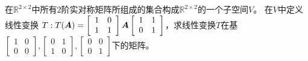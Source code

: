 \begin{frame}
  \begin{li}
    在$\mathbb R^{2\times 2}$中所有$2$阶实对称矩阵所组成的集合构成$\mathbb R^{2\times 2}$的一个子空间$V$。
    在$V$中定义线性变换
    $T:T(\boldsymbol{A})=
    \left[
      \begin{array}{cc}
        1&0\\
        1&1
      \end{array}
    \right]\boldsymbol{A}
    \left[
      \begin{array}{cc}
        1&1\\
        0&1
      \end{array}
    \right]$，求线性变换$T$在基$\left[
      \begin{array}{cc}
        1&0\\
        0&0
      \end{array}
    \right],\left[
      \begin{array}{cc}
        0&1\\
        1&0
      \end{array}
    \right],\left[
      \begin{array}{cc}
        0&0\\
        0&1
      \end{array}
    \right]$下的矩阵。
  \end{li}
   

\end{frame}
